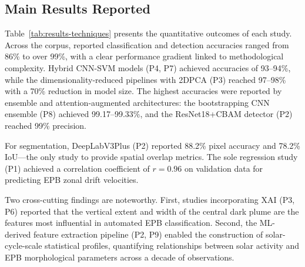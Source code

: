 \subsection{Main Results Reported}\label{subsec:main-results-reported}

Table~\ref{tab:results-techniques} presents the quantitative outcomes of each study. Across the corpus, reported classification and detection accuracies ranged from 86\% to over 99\%, with a clear performance gradient linked to methodological complexity. Hybrid CNN-SVM models (P4, P7) achieved accuracies of 93--94\%, while the dimensionality-reduced pipelines with 2DPCA (P3) reached 97--98\% with a 70\% reduction in model size. The highest accuracies were reported by ensemble and attention-augmented architectures: the bootstrapping CNN ensemble (P8) achieved 99.17--99.33\%, and the ResNet18+CBAM detector (P2) reached 99\% precision.

For segmentation, DeepLabV3Plus (P2) reported 88.2\% pixel accuracy and 78.2\% IoU---the only study to provide spatial overlap metrics. The sole regression study (P1) achieved a correlation coefficient of $r = 0.96$ on validation data for predicting EPB zonal drift velocities.

Two cross-cutting findings are noteworthy. First, studies incorporating XAI (P3, P6) reported that the vertical extent and width of the central dark plume are the features most influential in automated EPB classification. Second, the ML-derived feature extraction pipeline (P2, P9) enabled the construction of solar-cycle-scale statistical profiles, quantifying relationships between solar activity and EPB morphological parameters across a decade of observations.
